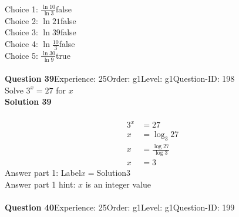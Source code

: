 \documentclass{article}
\begin{document}
Choice 1: \hspace{20pt}$\displaystyle\frac{\ln10}{\ln3}$\hspace{20pt}false\\
Choice 2: \hspace{20pt}$\ln{21}$\hspace{20pt}false\\
Choice 3: \hspace{20pt}$\ln{39}$\hspace{20pt}false\\
Choice 4: \hspace{20pt}$\ln{\displaystyle\frac{10}{3}}$\hspace{20pt}false\\
Choice 5: \hspace{20pt}$\displaystyle\frac{\ln30}{\ln9}$\hspace{20pt}true\\
\\[4pt]
\noindent\textbf{Question 39}\hspace{20pt}Experience: 25\hspace{20pt}Order: g1\hspace{20pt}Level: g1\hspace{20pt}Question-ID: 198\\[2pt]
Solve $3^x=27$ for $x$\\[4pt]
\noindent\textbf{Solution 39}\\[2pt]
\\[-35pt]\begin{align*}
3^x&=27\\[2pt]
x&=\log_{3}27\\[2pt]
x&=\displaystyle\frac{\log27}{\log3}\\[2pt]
x&=3
\end{align*}
Answer part 1: \hspace{10pt}Label\hspace{10pt}$x=$\hspace{10pt}Solution\hspace{10pt}3\\
Answer part 1 hint: \hspace{15pt}$x$ is an integer value\\
\\[4pt]
\noindent\textbf{Question 40}\hspace{20pt}Experience: 25\hspace{20pt}Order: g1\hspace{20pt}Level: g1\hspace{20pt}Question-ID: 199\\[2pt]
\end{document}
